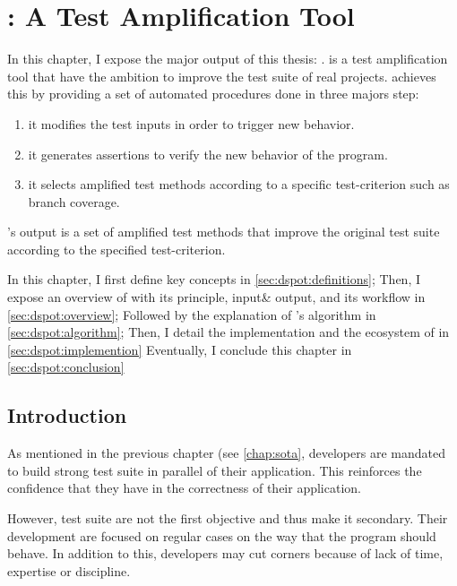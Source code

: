 \chapter{\dspot: A Test Amplification Tool}
\label{chap:dspot}

\begin{chaptersummary}
		In this chapter, I expose the major output of this thesis: \dspot.
		\dspot is a test amplification tool that have the ambition to improve the test suite of real projects.
		\dspot achieves this by providing a set of automated procedures done in three majors step:
		\begin{enumerate}
			\item it modifies the test inputs in order to trigger new behavior.
			\item it generates assertions to verify the new behavior of the program.
			\item it selects amplified test methods according to a specific test-criterion such as branch coverage.
		\end{enumerate}
	
		\dspot's output is a set of amplified test methods that improve the original test suite according to the specified test-criterion.
		
		In this chapter, I first define key concepts in \autoref{sec:dspot:definitions};
		Then, I expose an overview of \dspot with its principle, input\& output, and its workflow in \autoref{sec:dspot:overview};
		Followed by the explanation of \dspot's algorithm in \autoref{sec:dspot:algorithm};
		Then, I detail the implementation and the ecosystem of \dspot in \autoref{sec:dspot:implemention}
		Eventually, I conclude this chapter in \autoref{sec:dspot:conclusion}
\end{chaptersummary}

\minitoc

\graphicspath{{.}{chapitres/dspot/}}

\section{Introduction}
\label{sec:dspot:introduction}

As mentioned in the previous chapter (see \autoref{chap:sota}, developers are mandated to build strong test suite in parallel of their application.
This reinforces the confidence that they have in the correctness of their application.

However, test suite are not the first objective and thus make it secondary.
Their development are focused on regular cases on the way that the program should behave.
In addition to this, developers may cut corners because of lack of time, expertise or discipline.

